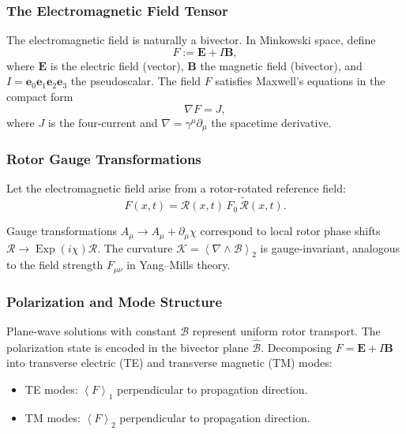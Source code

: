 \documentclass[11pt,a4paper]{article}
\newcommand{\e}{\mathbf{e}}
\newcommand{\grade}[2]{\left\langle #1 \right\rangle_{#2}}
\newcommand{\vecp}[1]{\grade{#1}{1}}
\newcommand{\biv}[1]{\grade{#1}{2}}
\newcommand{\rev}[1]{\widetilde{#1}}           %
\newcommand{\Exp}{\operatorname{Exp}}
\newcommand{\Rotor}{\mathcal{R}}
\newcommand{\Biv}{\mathcal{B}}
\newcommand{\D}{\nabla}                        %
\theoremstyle{definition}
\theoremstyle{plain}
\theoremstyle{remark}
\begin{document}
\subsubsection{The Electromagnetic Field Tensor}

The electromagnetic field is naturally a bivector. In Minkowski space, define
\begin{equation}
F := \mathbf{E} + I\mathbf{B},
\end{equation}
where $\mathbf{E}$ is the electric field (vector), $\mathbf{B}$ the magnetic field (bivector), and $I = \e_0\e_1\e_2\e_3$ the pseudoscalar. The field $F$ satisfies Maxwell's equations in the compact form
\begin{equation}
\D F = J,
\end{equation}
where $J$ is the four-current and $\D = \gamma^\mu \partial_\mu$ the spacetime derivative.

\subsubsection{Rotor Gauge Transformations}

Let the electromagnetic field arise from a rotor-rotated reference field:
\begin{equation}
F(x,t) = \Rotor(x,t)\, F_0\, \rev{\Rotor}(x,t).
\end{equation}

Gauge transformations $A_\mu \to A_\mu + \partial_\mu \chi$ correspond to local rotor phase shifts $\Rotor \to \Exp(i\chi)\Rotor$. The curvature $\mathcal{K} = \biv{\D \wedge \Biv}$ is gauge-invariant, analogous to the field strength $F_{\mu\nu}$ in Yang--Mills theory.

\subsubsection{Polarization and Mode Structure}

Plane-wave solutions with constant $\Biv$ represent uniform rotor transport. The polarization state is encoded in the bivector plane $\hat{\Biv}$. Decomposing $F = \mathbf{E} + I\mathbf{B}$ into transverse electric (TE) and transverse magnetic (TM) modes:
\begin{itemize}
  \item TE modes: $\vecp{F}$ perpendicular to propagation direction.
  \item TM modes: $\biv{F}$ perpendicular to propagation direction.
\end{itemize}
\end{document}
